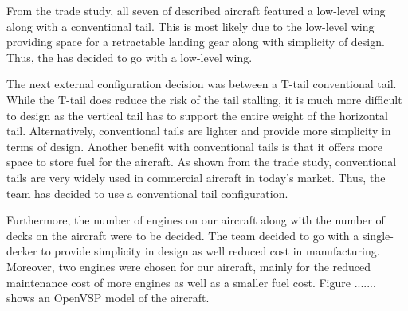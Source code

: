 From the trade study, all seven of described aircraft featured a low-level wing along with a conventional tail. This is most likely due to the low-level wing providing space for a retractable landing gear along with simplicity of design. Thus, the has decided to go with a low-level wing.

The next external configuration decision was between a T-tail conventional tail. While the T-tail does reduce the risk of the tail stalling, it is much more difficult to design as the vertical tail has to support the entire weight of the horizontal tail. Alternatively, conventional tails are lighter and provide more simplicity in terms of design. Another benefit with conventional tails is that it offers more space to store fuel for the aircraft. As shown from the trade study, conventional tails are very widely used in commercial aircraft in today's market. Thus, the team has decided to use a conventional tail configuration. 

Furthermore, the number of engines on our aircraft along with the number of decks on the aircraft were to be decided. The team decided to go with a single-decker to provide simplicity in design as well reduced cost in manufacturing. Moreover, two engines were chosen for our aircraft, mainly for the reduced maintenance cost of more engines as well as a smaller fuel cost. Figure ....... shows an OpenVSP model of the aircraft. 

